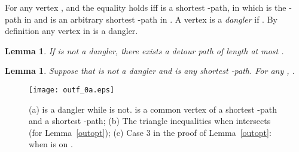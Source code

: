 \documentclass[review]{elsarticle}
\def\squarebox#1{\hbox to #1{\hfill\vbox to #1{\vfill}}}
\renewcommand{\qed}{\hspace*{\fill}
            \vbox{\hrule\hbox{\vrule\squarebox{.667em}\vrule}\hrule}\smallskip\newline}
\newtheorem{lem}[thm]{Lemma}
\begin{document}
For any vertex ,  and the
equality holds iff  is a shortest -path,
in which  is the -path in  and  is an
arbitrary shortest -path in . A vertex  is a
\emph{dangler} if . By definition any
vertex in  is a dangler.
\begin{lem}\label{dangler1}
If  is not a dangler, there exists a detour path  of length at
most .
\end{lem}

\begin{lem}\label{dangler2}
Suppose that  is not a dangler and  is any shortest -path.
For any , .
\end{lem}


\begin{figure}[t]
\begin{center}
\texttt{[image: outf\_0a.eps]}
\caption{{\rm (a)}  is a dangler while  is not.  is a common
vertex of a shortest -path and a shortest -path; {\rm (b)} The
triangle inequalities when  intersects  (for
Lemma~\ref{outopt}); {\rm (c)} Case 3 in the proof of {\rm Lemma~\ref{outopt}}:
when  is on .  } \label{outf}
\end{center}
\vspace{10pt}
\end{figure}
\end{document}
